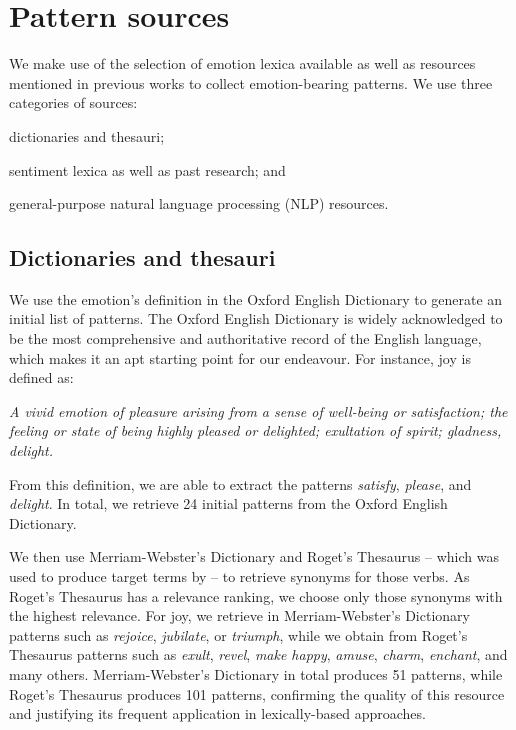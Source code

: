 \section{Pattern sources} \label{sec:pattern_sources}

We make use of the selection of emotion lexica available as well as resources mentioned in previous works to collect emotion-bearing patterns. We use three categories of sources: \begin{inparaenum} \item dictionaries and thesauri; \item sentiment lexica as well as past research; and \item general-purpose natural language processing (NLP) resources.
\end{inparaenum}  

\subsection{Dictionaries and thesauri}

We use the emotion's definition in the Oxford English Dictionary to generate an initial list of patterns. The Oxford English Dictionary is widely acknowledged to be the most comprehensive and authoritative record of the English language, which makes it an apt starting point for our endeavour. For instance, joy is defined as:

\textit{A vivid emotion of pleasure arising from a sense of well-being or
satisfaction; the feeling or state of being highly pleased or delighted;
exultation of spirit; gladness, delight.}

From this definition, we are able to extract the patterns \textit{satisfy}, \textit{please}, and \textit{delight}. In total, we retrieve 24 initial patterns from the Oxford English Dictionary.

We then use Merriam-Webster's Dictionary and Roget's Thesaurus -- which was used to produce target terms by \citeauthor{nrc_emolex} -- to retrieve synonyms for those verbs. As Roget's Thesaurus has a relevance ranking, we choose only those synonyms with the highest relevance. For joy, we retrieve in Merriam-Webster's Dictionary patterns such as \textit{rejoice}, \textit{jubilate}, or \textit{triumph}, while we obtain from Roget's Thesaurus patterns such as \textit{exult}, \textit{revel}, \textit{make happy}, \textit{amuse}, \textit{charm}, \textit{enchant}, and many others. Merriam-Webster's Dictionary in total produces 51 patterns, while Roget's Thesaurus produces 101 patterns, confirming the quality of this resource and justifying its frequent application in lexically-based approaches.

